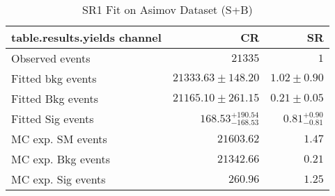 

\begin{table}
\centering
\small
\begin{tabular*}{\textwidth}{@{\extracolsep{\fill}}lrr}
\toprule
\textbf{table.results.yields channel}           & CR            & SR              \\
\midrule
Observed events          & $21335$              & $1$                    \\
\midrule
Fitted bkg events         & $21333.63 \pm 148.20$          & $1.02 \pm 0.90$              \\
\midrule
        Fitted Bkg events         & $21165.10 \pm 261.15$          & $0.21 \pm 0.05$              \\
        Fitted Sig events         & $168.53_{-168.53}^{+190.54}$          & $0.81_{-0.81}^{+0.90}$              \\
 \midrule
MC exp. SM events              & $21603.62$          & $1.47$              \\
\midrule
        MC exp. Bkg events         & $21342.66$          & $0.21$              \\
        MC exp. Sig events         & $260.96$          & $1.25$              \\
\bottomrule
\end{tabular*}
\caption{SR1 Fit on Asimov Dataset (S+B)}
\label{}
\end{table}
%